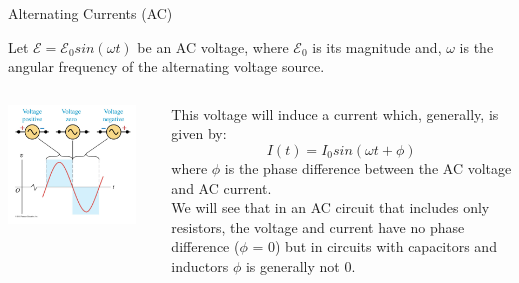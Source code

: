 \begin{frame}{Alternating Currents (AC)}

Let $\displaystyle \mathcal{E} = \mathcal{E}_0 sin(\omega t)$
be an AC voltage, where $\mathcal{E}_0$ is its magnitude and,
$\omega$ is the angular frequency of the alternating voltage source.\\

\vspace{0.2cm}

\begin{columns}
  \begin{column}{0.55\textwidth}
    \begin{center}
       \includegraphics[width=0.90\textwidth]{./images/schematics/ac.png}\\
     \end{center}
  \end{column}
  \begin{column}{0.45\textwidth}
     This voltage will induce a current which, generally, is given by:
     \begin{equation*}
          I(t) = I_0 sin(\omega t + \phi)
     \end{equation*}
     where $\phi$ is the phase difference between the AC voltage and AC current.\\
     \vspace{0.2cm}
     {\small
       We will see that in an AC circuit that includes only resistors, the voltage and current have no phase difference ($\phi$ = 0)
       but in circuits with capacitors and inductors $\phi$ is  generally not 0.\\
     }
  \end{column}
\end{columns}

\end{frame}

